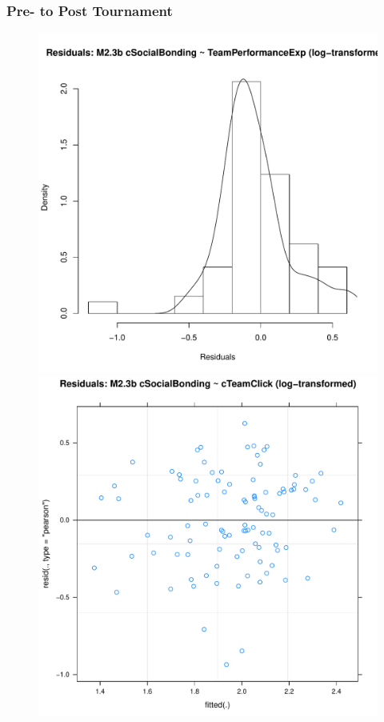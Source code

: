 {      \subsubsection{Pre- to Post Tournament\label{app8:MLM23b}}

          
          \restoregeometry



      \begin{figure}[htbp]
        \includegraphics[scale =.4]{images/MLM23bLogHist.pdf}
        \includegraphics[scale =.4]{images/MLM23bLogScatter.pdf}

\end{figure}}
